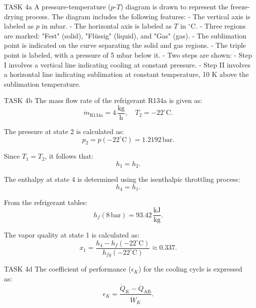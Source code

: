 TASK 4a  
A pressure-temperature (\(p\)-\(T\)) diagram is drawn to represent the freeze-drying process. The diagram includes the following features:  
- The vertical axis is labeled as \(p\) in mbar.  
- The horizontal axis is labeled as \(T\) in \(^\circ\text{C}\).  
- Three regions are marked: "Fest" (solid), "Flüssig" (liquid), and "Gas" (gas).  
- The sublimation point is indicated on the curve separating the solid and gas regions.  
- The triple point is labeled, with a pressure of 5 mbar below it.  
- Two steps are shown:  
  - Step I involves a vertical line indicating cooling at constant pressure.  
  - Step II involves a horizontal line indicating sublimation at constant temperature, 10 K above the sublimation temperature.  

TASK 4b  
The mass flow rate of the refrigerant R134a is given as:  
\[
\dot{m}_{\text{R134a}} = 4 \, \frac{\text{kg}}{\text{h}}, \quad T_2 = -22^\circ\text{C}.
\]  

The pressure at state 2 is calculated as:  
\[
p_2 = p(-22^\circ\text{C}) = 1.2192 \, \text{bar}.
\]  

Since \(T_1 = T_2\), it follows that:  
\[
h_1 = h_2.
\]  

The enthalpy at state 4 is determined using the isenthalpic throttling process:  
\[
h_4 = h_1.
\]  

From the refrigerant tables:  
\[
h_{f}(8 \, \text{bar}) = 93.42 \, \frac{\text{kJ}}{\text{kg}}.
\]  

The vapor quality at state 1 is calculated as:  
\[
x_1 = \frac{h_4 - h_f(-22^\circ\text{C})}{h_{fg}(-22^\circ\text{C})} \approx 0.337.
\]  

TASK 4d  
The coefficient of performance (\(\epsilon_K\)) for the cooling cycle is expressed as:  
\[
\epsilon_K = \frac{\dot{Q}_K - \dot{Q}_{\text{AB}}}{\dot{W}_K}.
\]  